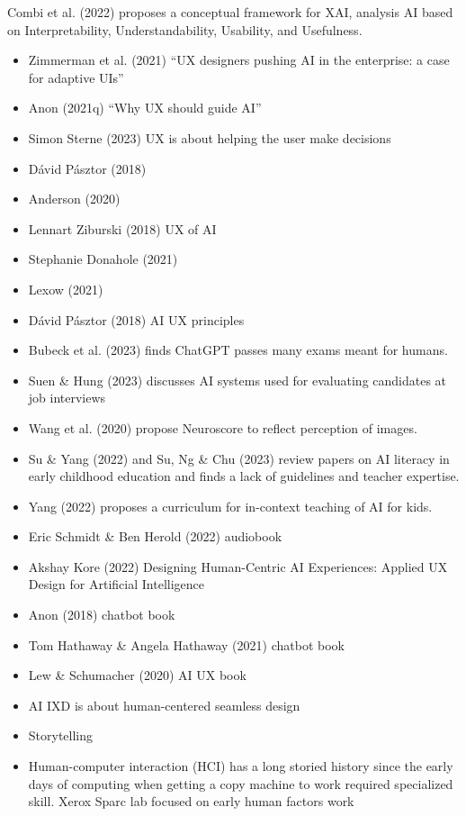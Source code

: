 \documentclass[
  letterpaper,
  DIV=11,
  numbers=noendperiod]{scrartcl}
\begin{document}
Combi et al. (2022) proposes a conceptual framework for XAI, analysis AI
based on Interpretability, Understandability, Usability, and Usefulness.

\begin{itemize}
\item
  Zimmerman et al. (2021) ``UX designers pushing AI in the enterprise: a
  case for adaptive UIs''
\item
  Anon (2021q) ``Why UX should guide AI''
\item
  Simon Sterne (2023) UX is about helping the user make decisions
\item
  Dávid Pásztor (2018)
\item
  Anderson (2020)
\item
  Lennart Ziburski (2018) UX of AI
\item
  Stephanie Donahole (2021)
\item
  Lexow (2021)
\item
  Dávid Pásztor (2018) AI UX principles
\item
  Bubeck et al. (2023) finds ChatGPT passes many exams meant for humans.
\item
  Suen \& Hung (2023) discusses AI systems used for evaluating
  candidates at job interviews
\item
  Wang et al. (2020) propose Neuroscore to reflect perception of images.
\item
  Su \& Yang (2022) and Su, Ng \& Chu (2023) review papers on AI
  literacy in early childhood education and finds a lack of guidelines
  and teacher expertise.
\item
  Yang (2022) proposes a curriculum for in-context teaching of AI for
  kids.
\item
  Eric Schmidt \& Ben Herold (2022) audiobook
\item
  Akshay Kore (2022) Designing Human-Centric AI Experiences: Applied UX
  Design for Artificial Intelligence
\item
  Anon (2018) chatbot book
\item
  Tom Hathaway \& Angela Hathaway (2021) chatbot book
\item
  Lew \& Schumacher (2020) AI UX book
\item
  AI IXD is about human-centered seamless design
\item
  Storytelling
\item
  Human-computer interaction (HCI) has a long storied history since the
  early days of computing when getting a copy machine to work required
  specialized skill. Xerox Sparc lab focused on early human factors work

\end{itemize}
\end{document}
